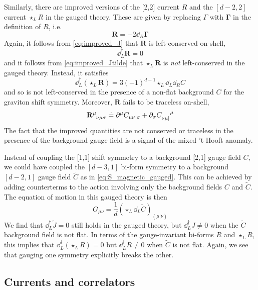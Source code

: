 Similarly, there are improved versions of the [2,2] current $R$ and the $[d-2,2]$ current $\star_L R$ in the gauged theory. These are given by replacing $\Gamma$ with $\mathbf{\Gamma}$ in the definition of $R$, i.e.\
\begin{equation}
    \mathbf{R} = -2 \dd_R \mathbf{\Gamma}
\end{equation}
Again, it follows from \eqref{eq:improved_J} that $\mathbf{R}$ is left-conserved on-shell,
\begin{equation}\label{eq:XY_anomaly1}
    \dd_L^\dag \mathbf{R} = 0
\end{equation}
and it follows from \eqref{eq:improved_Jtilde} that $\star_L \mathbf{R}$ is \emph{not} left-conserved in the gauged theory. Instead, it satisfies
\begin{equation}\label{eq:XY_anomaly2}
    \dd_L^\dag (\star_L \mathbf{R}) = 3(-1)^{d-1} \star_L \dd_L \dd_R C
\end{equation}
and so is not left-conserved in the presence of a non-flat background $C$ for the graviton shift symmetry.
Moreover, $\mathbf{R}$ fails to be traceless on-shell,
\begin{equation}\label{eq:trace_anom}
    \mathbf{R}\indices{^\mu_{\nu\mu\sigma}} \doteq \partial^\mu C_{\mu\nu|\sigma} + \partial_\sigma C\indices{_{\nu\mu|}^\mu}
\end{equation}
The fact that the improved quantities are not conserved or traceless in the presence of the background gauge field is a signal of the mixed 't Hooft anomaly.

Instead of coupling the [1,1] shift symmetry to a background [2,1] gauge field $C$, we could have coupled the $[d-3,1]$ bi-form symmetry to a background $[d-2,1]$ gauge field $\tilde{C}$ as in \eqref{eq:S_magnetic_gauged}. This can be achieved by adding counterterms to the action involving only the background fields $C$ and $\tilde{C}$.
The equation of motion in this gauged theory is then
\begin{equation}
    G_{\mu\nu} = \frac{1}{d} (\star_L \dd_L \tilde{C})_{(\mu|\nu)}
\end{equation}
We find that $\dd_L^\dag \tilde{J} = 0$ still holds in the gauged theory, but $\dd_L^\dag J \neq0$ when the $\tilde{C}$ background field is not flat. In terms of the gauge-invariant bi-forms $R$ and $\star_L R$, this implies that $\dd_L^\dag (\star_L R)=0$ but $\dd_L^\dag R \neq0$ when $\tilde{C}$ is not flat. Again, we see that gauging one symmetry explicitly breaks the other.


\subsection{Currents and correlators}

